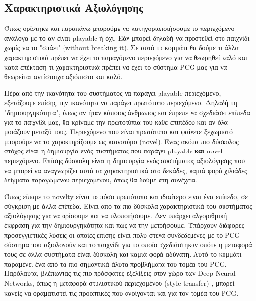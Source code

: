 \subsection{Χαρακτηριστικά Αξιολόγησης}
Όπως ορίστηκε και παραπάνω μπορούμε να κατηγοριοποιήσουμε το περιεχόμενο ανάλογα με το αν είναι playable ή όχι. Εάν μπορεί δηλαδή να προστεθεί στο παιχνίδι χωρίς να το "σπάει" (without breaking it). Σε αυτό το κομμάτι θα δούμε τι άλλα χαρακτηριστικά πρέπει να έχει το παραγόμενο περιεχόμενο για να θεωρηθεί καλό και κατά επέκταση τι χαρακτηριστικά πρέπει να έχει το σύστημα PCG μας για να θεωρείται αντίστοιχα αξιόπιστο και καλό.
\par
Πέρα από την ικανότητα του συστήματος να παράγει playable περιεχόμενο, εξετάζουμε επίσης την ικανότητα να παράγει πρωτότυπο περιεχόμενο. Δηλαδή τη "δημιουργηκότητα", όπως αν ήταν κάποιος άνθρωπος και έπρεπε να σχεδιάσει επίπεδα για το παιχνίδι μας, θα κρίναμε την πρωτοτύπια του κάθε επιπέδου και αν όλα μοιάζουν μεταξύ τους. Περιεχόμενο που είναι πρωτότυπο και φαίνετε ξεχωριστό μπορούμε να το χαρακτηρίζουμε ως καινοτόμο (novel). Ένας ακόμα πιο δύσκολος στόχος είναι η δημιουργία ενός συστήματος που παράγει playable \textbf{και} novel περιεχόμενο. Επίσης δύσκολη είναι η δημιουργία ενός συστήματος αξιολόγησης που να μπορεί να αναγνωρίζει αυτά τα χαρακτηριστικά στα δεκάδες, καμιά φορά χιλιάδες δείγματα παραγώμενου περιεχομένου, όπως θα δούμε στη συνέχεια.
\par
Όπως είπαμε το novelty είναι το πόσο πρωτότυπο και ιδιαίτερο είναι ένα επίπεδο, σε σύγκριση με άλλα επίπεδα. Είναι από τα πιο δύσκολα χαρακτηριστικά του συστήματος αξιολόγησης για να ορίσουμε και να υλοποιήσουμε. Δεν υπάρχει αλγοριθμική έκφραση για την δημιουργηκότητα και πως να την μετρήσουμε. Υπάρχουν διάφορες προσεγγιστικές λύσεις οι οποίες επίσης είναι πολύ στενά συνδεδεμένες με το PCG σύστημα που αξιολογούν και το παιχνίδι για το οποίο σχεδιάστηκαν οπότε η μεταφορά τους σε άλλα συστήματα είναι δύσκολη και καμιά φορά αδύνατη. Αυτό το κομμάτι παραμένει ένα από τα πιο σημαντικά άλυτα προβλήματα του τομέα του PCG. Παρόλαυτα, βλέπωντας τις πιο πρόσφατες εξελίξεις στον χώρο των Deep Neural Networks, όπως η μεταφορά στυλιστικού περιεχομένου (style transfer) \cite{styletransfer}, μπορεί κανείς να οραματιστεί τις προοπτικές που ανοίγονται και για τον τομέα του PCG.
\par
